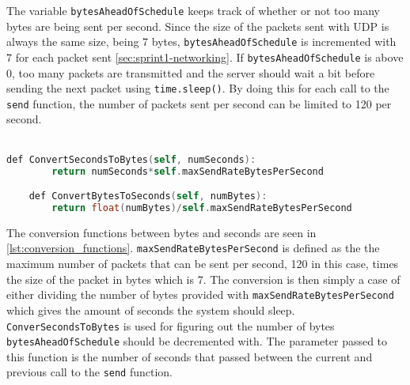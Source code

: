 The variable \texttt{bytesAheadOfSchedule} keeps track of whether or not too many bytes are being sent per second.
Since the size of the packets sent with UDP is always the same size, being 7 bytes, \texttt{bytesAheadOfSchedule} is incremented with 7 for each packet sent \autoref{sec:sprint1-networking}.
If \texttt{bytesAheadOfSchedule} is above 0, too many packets are transmitted and the server should wait a bit before sending the next packet using \texttt{time.sleep()}.
By doing this for each call to the \texttt{send} function, the number of packets sent per second can be limited to 120 per second.
\\\\
\begin{lstlisting}[caption={function for converting seconds to bytes and bytes to seconds}, captionpos=b,language=C,label={lst:conversion_functions}]
    def ConvertSecondsToBytes(self, numSeconds):
        return numSeconds*self.maxSendRateBytesPerSecond

    def ConvertBytesToSeconds(self, numBytes):
        return float(numBytes)/self.maxSendRateBytesPerSecond
\end{lstlisting}
\noindent
The conversion functions between bytes and seconds are seen in \autoref{lst:conversion_functions}.
\texttt{maxSendRateBytesPerSecond} is defined as the the maximum number of packets that can be sent per second, 120 in this case, times the size of the packet in bytes which is 7.
The conversion is then simply a case of either dividing the number of bytes provided with \texttt{maxSendRateBytesPerSecond} which gives the amount of seconds the system should sleep.
\texttt{ConverSecondsToBytes} is used for figuring out the number of bytes \texttt{bytesAheadOfSchedule} should be decremented with.
The parameter passed to this function is the number of seconds that passed between the current and previous call to the \texttt{send} function.
